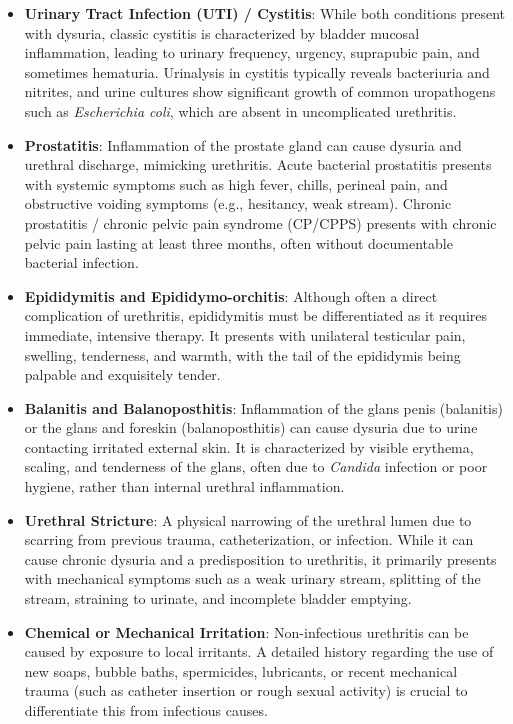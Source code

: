 \begin{itemize}
    \item \textbf{Urinary Tract Infection (UTI) / Cystitis}: While both conditions present with dysuria, classic cystitis is characterized by bladder mucosal inflammation, leading to urinary frequency, urgency, suprapubic pain, and sometimes hematuria. Urinalysis in cystitis typically reveals bacteriuria and nitrites, and urine cultures show significant growth of common uropathogens such as \textit{Escherichia coli}, which are absent in uncomplicated urethritis.

    \item \textbf{Prostatitis}: Inflammation of the prostate gland can cause dysuria and urethral discharge, mimicking urethritis. Acute bacterial prostatitis presents with systemic symptoms such as high fever, chills, perineal pain, and obstructive voiding symptoms (e.g., hesitancy, weak stream). Chronic prostatitis / chronic pelvic pain syndrome (CP/CPPS) presents with chronic pelvic pain lasting at least three months, often without documentable bacterial infection.

    \item \textbf{Epididymitis and Epididymo-orchitis}: Although often a direct complication of urethritis, epididymitis must be differentiated as it requires immediate, intensive therapy. It presents with unilateral testicular pain, swelling, tenderness, and warmth, with the tail of the epididymis being palpable and exquisitely tender.

    \item \textbf{Balanitis and Balanoposthitis}: Inflammation of the glans penis (balanitis) or the glans and foreskin (balanoposthitis) can cause dysuria due to urine contacting irritated external skin. It is characterized by visible erythema, scaling, and tenderness of the glans, often due to \textit{Candida} infection or poor hygiene, rather than internal urethral inflammation.

    \item \textbf{Urethral Stricture}: A physical narrowing of the urethral lumen due to scarring from previous trauma, catheterization, or infection. While it can cause chronic dysuria and a predisposition to urethritis, it primarily presents with mechanical symptoms such as a weak urinary stream, splitting of the stream, straining to urinate, and incomplete bladder emptying.

    \item \textbf{Chemical or Mechanical Irritation}: Non-infectious urethritis can be caused by exposure to local irritants. A detailed history regarding the use of new soaps, bubble baths, spermicides, lubricants, or recent mechanical trauma (such as catheter insertion or rough sexual activity) is crucial to differentiate this from infectious causes.


\end{itemize}
